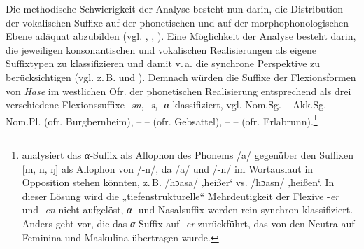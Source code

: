 Die methodische Schwierigkeit der Analyse besteht nun darin, die Distribution der vokalischen Suffixe auf der phonetischen und auf der morphophonologischen Ebene adäquat abzubilden (vgl. \citealt[40--43]{Hinderling1980}, \citealt[126--129]{Rowley1997}, \citealt[29--30]{SMF7}). Eine Möglichkeit der Analyse besteht darin, die jeweiligen konsonantischen und vokalischen Realisierungen als eigene Suffixtypen zu klassifizieren und damit v.\,a. die synchrone Perspektive zu berücksichtigen (vgl. z.\,B. \citealt[38]{Gladiator1971} und \citealt[57--60]{Kufner1961}). Demnach würden die Suffixe der Flexionsformen von \textit{Hase} im westlichen Ofr. der phonetischen Realisierung entsprechend als drei verschiedene Flexionssuffixe -\textit{ən}, -\textit{ə}, -\textit{α} klassifiziert, vgl. Nom.Sg.  -- Akk.Sg.  -- Nom.Pl.  (ofr. Burgbernheim),  --  -- (ofr. Gebsattel),  --   --  (ofr. Erlabrunn).\footnote{\citet[38]{Gladiator1971} analysiert das \textit{α}{}-Suffix als Allophon des Phonems /a/ gegenüber den Suffixen [m, n, ŋ] als Allophon von /-n/, da /a/ und /-n/ im Wortauslaut in Opposition stehen könnten, z.\,B. /hɔasa/ ‚heißer‘ vs. /hɔasn/ ‚heißen‘. In dieser Lösung wird die „tiefenstrukturelle“ Mehrdeutigkeit \citep[127]{Rowley1997} der Flexive -\textit{er} und -\textit{en} nicht aufgelöst, \textit{α}{}- und Nasalsuffix werden rein synchron klassifiziert. Anders geht \citet[§27]{Micko-Repp1933} vor, die das \textit{α}{}-Suffix auf -\textit{er} zurückführt, das von den Neutra auf Feminina und Maskulina übertragen wurde.}


